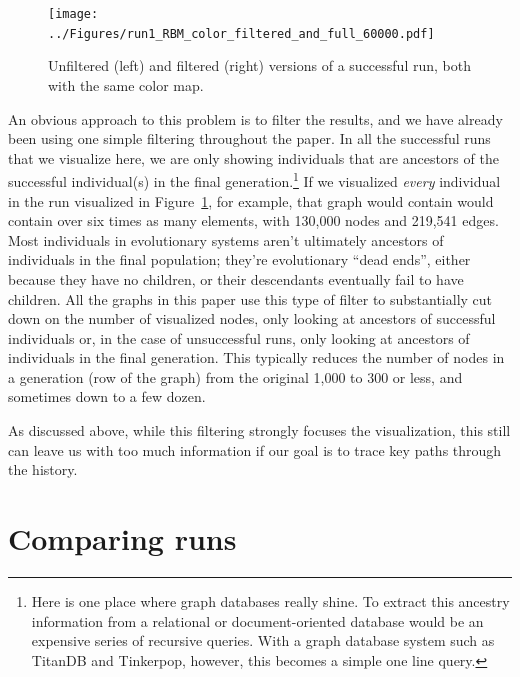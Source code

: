 \documentclass{sig-alternate}
\begin{document}
\begin{figure}[tb]
	\begin{center}
		\texttt{[image: ../Figures/run1\_RBM\_color\_filtered\_and\_full\_60000.pdf]}
	\end{center}
	\caption{Unfiltered (left) and filtered (right) versions of a successful run, both with the same color map.}
	\label{fig:lexRun1FilteredAndFull}
\end{figure}

An obvious approach to this problem is to filter the results, and we have already
been using one simple filtering throughout the paper. In all the successful runs
that we visualize here, we are only showing individuals that are ancestors of the
successful individual(s) in the final generation.\footnote{Here is one place where
graph databases really shine. To extract this ancestry information from a relational
or document-oriented database would be an expensive series of recursive queries. With
a graph database system such as TitanDB and Tinkerpop, however, this becomes a 
simple one line query.}
If we visualized \emph{every}
individual in the run visualized in Figure~\ref{fig:lexRun1FilteredAndFull}, for 
example, that graph would contain would contain over six times as many elements,
with 130,000 nodes and 219,541 edges. Most individuals in evolutionary systems 
aren't ultimately
ancestors of individuals in the final population; they're evolutionary ``dead ends'',
either because they have no children, or their descendants eventually fail to have
children. All the graphs in this paper use this type of filter to substantially
cut down on the number of visualized nodes, only looking at
ancestors of successful individuals or, in the case of unsuccessful runs, only
looking at ancestors of individuals in the final generation. This typically 
reduces the number of nodes 
in a generation (row of the graph) from the original 1,000 to 300 or less, and sometimes 
down to a few dozen.

As discussed above, while this filtering strongly focuses the visualization, this still 
can leave us with too much information if our goal is to trace key paths through the 
history. 

\section{Comparing runs}
\label{sec:comparisons}

\end{document}
